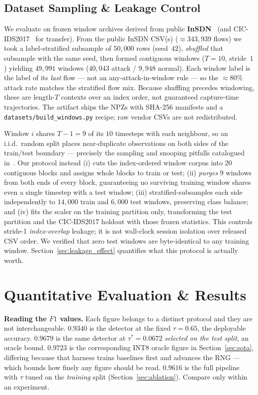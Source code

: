 \documentclass[conference,a4paper]{IEEEtran}
\begin{document}
\subsection{Dataset Sampling \& Leakage Control}
\label{sec:protocol}
We evaluate on frozen window archives derived from public \textbf{InSDN}~\cite{b1} (and CIC-IDS2017~\cite{b2} for transfer). From the public InSDN CSV(s) ($\approx\!343{,}939$ flows) we took a label-stratified subsample of $50{,}000$ rows (seed~$42$), \emph{shuffled} that subsample with the same seed, then formed contiguous windows ($T=10$, stride~$1$) yielding $49{,}991$ windows ($40{,}043$ attack / $9{,}948$ normal). Each window label is the label of its \emph{last} flow --- not an any-attack-in-window rule --- so the $\approx\!80\%$ attack rate matches the stratified flow mix. Because shuffling precedes windowing, these are length-$T$ contexts over an index order, not guaranteed capture-time trajectories. The artifact ships the NPZs with SHA-256 manifests and a \texttt{datasets/build\_windows.py} recipe; raw vendor CSVs are not redistributed.

Window $i$ shares $T-1 = 9$ of its $10$ timesteps with each neighbour, so an i.i.d.\ random split places near-duplicate observations on both sides of the train/test boundary --- precisely the sampling and snooping pitfalls catalogued in~\cite{b23,b24}. Our protocol instead (i) cuts the index-ordered window corpus into $20$ contiguous blocks and assigns whole blocks to train or test; (ii) \emph{purges} $9$ windows from both ends of every block, guaranteeing no surviving training window shares even a single timestep with a test window; (iii) stratified-subsamples each side independently to $14{,}000$ train and $6{,}000$ test windows, preserving class balance; and (iv) fits the scaler on the training partition only, transforming the test partition and the CIC-IDS2017 holdout with those frozen statistics. This controls stride-1 \emph{index-overlap} leakage; it is not wall-clock session isolation over released CSV order. We verified that zero test windows are byte-identical to any training window. Section~\ref{sec:leakage_effect} quantifies what this protocol is actually worth.

\section{Quantitative Evaluation \& Results}
\label{sec:results}

\textbf{Reading the $F1$ values.} Each figure belongs to a distinct protocol and they are not interchangeable. $0.9340$ is the detector at the fixed $\tau=0.65$, the deployable accuracy. $0.9679$ is the same detector at $\tau^*=0.0672$ \emph{selected on the test split}, an oracle bound. $0.9723$ is the corresponding INT8 oracle figure in Section~\ref{sec:sota}, differing because that harness trains baselines first and advances the RNG --- which bounds how finely any figure should be read. $0.9616$ is the full pipeline with $\tau$ tuned on the \emph{training} split (Section~\ref{sec:ablation}). Compare only within an experiment.
\end{document}
